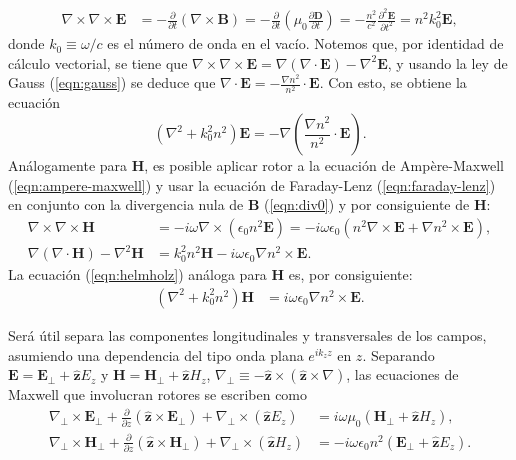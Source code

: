 \begin{align}
	\nabla\times\nabla\times\textbf{E} &= -\frac{\partial}{\partial t}(\nabla\times\textbf{B}) = -\frac{\partial}{\partial t}\left(\mu_0\frac{\partial \textbf{D}}{\partial t}\right) = -\frac{n^2}{c^2}\frac{\partial^2 \textbf{E}}{\partial t^2} = n^2k_0^2 \textbf{E}, \label{eqn:rotordoble}
\end{align}
donde $k_0 \equiv \omega/c$ es el número de onda en el vacío. Notemos que, por identidad de cálculo vectorial, se tiene que $\nabla\times\nabla\times\textbf{E} = \nabla(\nabla\cdot\textbf{E}) - \nabla^2\textbf{E}$, y usando la ley de Gauss (\ref{eqn:gauss}) se deduce que $\nabla\cdot \textbf{E} = -\frac{\nabla n^2}{n^2}\cdot\textbf{E}$. Con esto, se obtiene la ecuación 
\begin{equation}
	\left(\nabla^2  + k_0^2n^2\right)\textbf{E} = -\nabla\left( \frac{\nabla n^2}{n^2} \cdot \textbf{E}  \right). \label{eqn:helmholz}
\end{equation}
Análogamente para \textbf{H}, es posible aplicar rotor a la ecuación de Ampère-Maxwell (\ref{eqn:ampere-maxwell}) y usar la ecuación de Faraday-Lenz (\ref{eqn:faraday-lenz}) en conjunto con la divergencia nula de \textbf{B} (\ref{eqn:div0}) y por consiguiente de \textbf{H}:
\begin{align}
	\nabla\times\nabla\times \textbf{H} &= -i \omega \nabla\times\left(\epsilon_0 n^2 \textbf{E}\right) = -i\omega \epsilon_0  \left(n^2 \nabla\times \textbf{E} + \nabla n^2 \times \textbf{E}\right),
	\nonumber
	\\
	\nabla\left( {\nabla\cdot \textbf{H}} \right)- \nabla^2 \textbf{H}
	&= 
	  k_0^2 n^2\textbf{H} - i\omega \epsilon_0 \nabla n^2 \times \textbf{E} .
	 	\nonumber
\end{align}
La ecuación (\ref{eqn:helmholz}) análoga para \textbf{H} es, por consiguiente:
\begin{align}
	 \left(\nabla^2  + k_0^2 n^2 \right) \textbf{H} &= i\omega \epsilon_0 \nabla n^2 \times \textbf{E}.
	 \label{eqn:helmholzH}
\end{align}

Será útil separa las componentes longitudinales y transversales de los campos, asumiendo una dependencia del tipo onda plana $e^{ik_z z}$ en $z$. Separando $\textbf{E}=\textbf{E}_\perp +\hat{\textbf{z}} E_z$ y $\textbf{H}=\textbf{H}_\perp +\hat{\textbf{z}} H_z$, $\nabla_\perp \equiv - \hat{\textbf{z}}\times (\hat{\textbf{z}}\times\nabla)   $, las ecuaciones de Maxwell que involucran rotores se escriben como
\begin{align}
	\nabla_\perp \times  \textbf{E}_\perp + \frac{\partial}{\partial z} (\hat{\textbf{z}} \times \textbf{E}_\perp) + \nabla_\perp \times (\hat{\textbf{z}} E_z) &= i\omega\mu_0(\textbf{H}_\perp +\hat{\textbf{z}} H_z),
	\label{eqn:Efield}
	\\
	\nabla_\perp \times  \textbf{H}_\perp + \frac{\partial}{\partial z} (\hat{\textbf{z}} \times \textbf{H}_\perp) + \nabla_\perp \times (\hat{\textbf{z}} H_z) &= -i\omega \epsilon_0 n^2 (\textbf{E}_\perp +\hat{\textbf{z}} E_z).
	\label{eqn:Hfield}
\end{align}

